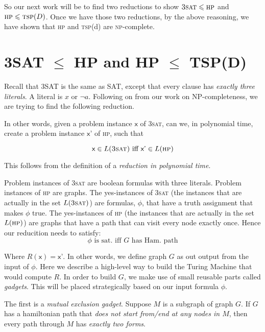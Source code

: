 So our next work will be to find two reductions to show 
$\textsc{3sat} \leqslant \textsc{hp}$
and $\textsc{hp} \leqslant \textsc{tsp}(D)$. Once we have those two reductions, 
by the above reasoning, we have shown that \textsc{hp} and \textsc{tsp}(d) 
are \textsc{np}-complete. 



\section{3SAT $\leqslant$ HP and HP $\leqslant$ TSP(D)}

Recall that 3SAT is the same as SAT, except that every clause has 
\textit{exactly three literals}. A literal is $x$ or $\neg a$. 
Following on from our work on NP-completeness, we are trying 
to find the following reduction.


In other words, given a problem instance $\textsf{x}$ of \textsc{3sat}, 
can we, in polynomial time, create a problem instance 
$\textsf{x'}$ of \textsc{hp}, such that

$$\textsf{x} \in L(\textsc{3sat}) \text{ iff } \textsf{x'} \in L(\textsc{hp})$$

This follows from the definition of a \textit{reduction in polynomial time}.

Problem instances of \textsc{3sat} are boolean formulas with three 
literals. Problem instances of \textsc{hp} are graphs.
The yes-instances of \textsc{3sat} (the instances that are actually 
in the set $L(\textsc{3sat})$) 
are formulas, $\phi$, that have a truth assignment that makes $\phi$ true. 
The yes-instances of \textsc{hp} (the instances that are actually 
in the set $L(\textsc{hp})$) 
are graphs that have a path that can visit every node exactly once.
Hence our reducition needs to satisfy: 
$$\phi \text{ is sat.} \text{ iff } G \text{ has Ham. path}$$

Where $R(\textsf{x}) = \textsf{x'}$. In other words, 
we define graph $G$ as out output from the input of $\phi$. 
Here we describe a high-level way to build the Turing Machine that 
would compute $R$. In order to build $G$, we make use of 
small reusable parts called \textit{gadgets}. 
This will be placed strategically based on our input formula $\phi$. 


\frmrule

The first is a \textit{mutual exclusion gadget}.
Suppose $M$ is a subgraph of graph $G$. 
If $G$ has a hamiltonian path that \textit{does not start from/end at 
any nodes in $M$}, then every path through $M$ has \textit{exactly two forms}. 

